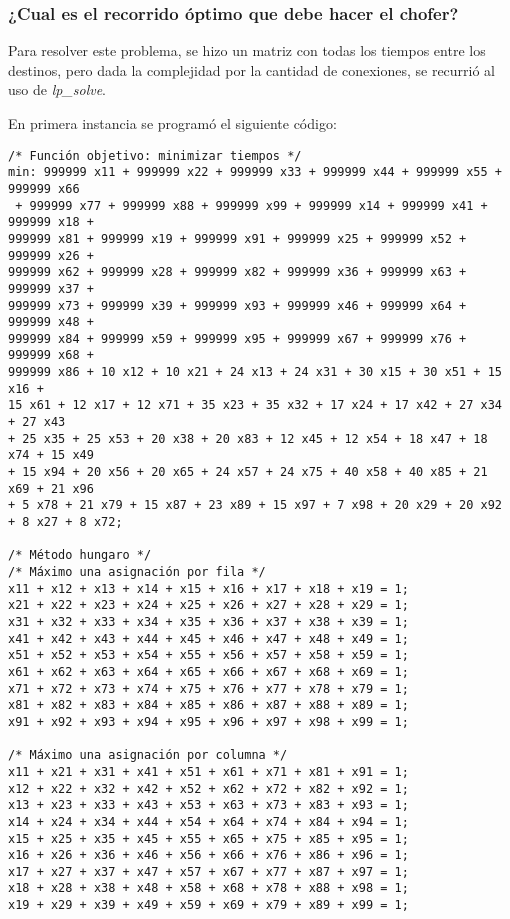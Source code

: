 \documentclass[12pt,letterpaper]{article}
\begin{document}
\subsubsection{¿Cual es el recorrido óptimo que debe hacer el chofer?}
Para resolver este problema, se hizo un matriz con todas los tiempos entre los destinos, pero dada la complejidad por la cantidad de conexiones, se recurrió al uso de \textit{lp\_solve}.

En primera instancia se programó el siguiente código:

\begin{verbatim}
/* Función objetivo: minimizar tiempos */
min: 999999 x11 + 999999 x22 + 999999 x33 + 999999 x44 + 999999 x55 + 999999 x66
 + 999999 x77 + 999999 x88 + 999999 x99 + 999999 x14 + 999999 x41 + 999999 x18 +
999999 x81 + 999999 x19 + 999999 x91 + 999999 x25 + 999999 x52 + 999999 x26 +
999999 x62 + 999999 x28 + 999999 x82 + 999999 x36 + 999999 x63 + 999999 x37 +
999999 x73 + 999999 x39 + 999999 x93 + 999999 x46 + 999999 x64 + 999999 x48 +
999999 x84 + 999999 x59 + 999999 x95 + 999999 x67 + 999999 x76 + 999999 x68 +
999999 x86 + 10 x12 + 10 x21 + 24 x13 + 24 x31 + 30 x15 + 30 x51 + 15 x16 +
15 x61 + 12 x17 + 12 x71 + 35 x23 + 35 x32 + 17 x24 + 17 x42 + 27 x34 + 27 x43
+ 25 x35 + 25 x53 + 20 x38 + 20 x83 + 12 x45 + 12 x54 + 18 x47 + 18 x74 + 15 x49
+ 15 x94 + 20 x56 + 20 x65 + 24 x57 + 24 x75 + 40 x58 + 40 x85 + 21 x69 + 21 x96
+ 5 x78 + 21 x79 + 15 x87 + 23 x89 + 15 x97 + 7 x98 + 20 x29 + 20 x92
+ 8 x27 + 8 x72; 

/* Método hungaro */
/* Máximo una asignación por fila */
x11 + x12 + x13 + x14 + x15 + x16 + x17 + x18 + x19 = 1;
x21 + x22 + x23 + x24 + x25 + x26 + x27 + x28 + x29 = 1;
x31 + x32 + x33 + x34 + x35 + x36 + x37 + x38 + x39 = 1;
x41 + x42 + x43 + x44 + x45 + x46 + x47 + x48 + x49 = 1;
x51 + x52 + x53 + x54 + x55 + x56 + x57 + x58 + x59 = 1;
x61 + x62 + x63 + x64 + x65 + x66 + x67 + x68 + x69 = 1;
x71 + x72 + x73 + x74 + x75 + x76 + x77 + x78 + x79 = 1;
x81 + x82 + x83 + x84 + x85 + x86 + x87 + x88 + x89 = 1;
x91 + x92 + x93 + x94 + x95 + x96 + x97 + x98 + x99 = 1;

/* Máximo una asignación por columna */
x11 + x21 + x31 + x41 + x51 + x61 + x71 + x81 + x91 = 1;
x12 + x22 + x32 + x42 + x52 + x62 + x72 + x82 + x92 = 1;
x13 + x23 + x33 + x43 + x53 + x63 + x73 + x83 + x93 = 1;
x14 + x24 + x34 + x44 + x54 + x64 + x74 + x84 + x94 = 1;
x15 + x25 + x35 + x45 + x55 + x65 + x75 + x85 + x95 = 1;
x16 + x26 + x36 + x46 + x56 + x66 + x76 + x86 + x96 = 1;
x17 + x27 + x37 + x47 + x57 + x67 + x77 + x87 + x97 = 1;
x18 + x28 + x38 + x48 + x58 + x68 + x78 + x88 + x98 = 1;
x19 + x29 + x39 + x49 + x59 + x69 + x79 + x89 + x99 = 1;
\end{verbatim}
\end{document}

